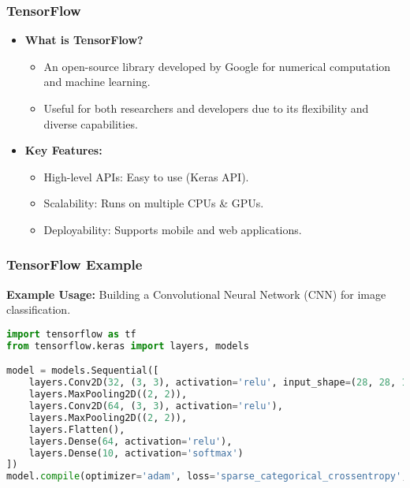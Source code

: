 \documentclass[aspectratio=169]{beamer}
\begin{document}
\begin{frame}
    \frametitle{TensorFlow}
    \begin{itemize}
        \item \textbf{What is TensorFlow?}
            \begin{itemize}
                \item An open-source library developed by Google for numerical computation and machine learning.
                \item Useful for both researchers and developers due to its flexibility and diverse capabilities.
            \end{itemize}
        \item \textbf{Key Features:}
            \begin{itemize}
                \item High-level APIs: Easy to use (Keras API).
                \item Scalability: Runs on multiple CPUs \& GPUs.
                \item Deployability: Supports mobile and web applications.
            \end{itemize}
    \end{itemize}
\end{frame}

\begin{frame}[fragile]
    \frametitle{TensorFlow Example}
    \textbf{Example Usage:} Building a Convolutional Neural Network (CNN) for image classification. 

    \begin{lstlisting}[language=Python]
import tensorflow as tf
from tensorflow.keras import layers, models

model = models.Sequential([
    layers.Conv2D(32, (3, 3), activation='relu', input_shape=(28, 28, 1)),
    layers.MaxPooling2D((2, 2)),
    layers.Conv2D(64, (3, 3), activation='relu'),
    layers.MaxPooling2D((2, 2)),
    layers.Flatten(),
    layers.Dense(64, activation='relu'),
    layers.Dense(10, activation='softmax')
])
model.compile(optimizer='adam', loss='sparse_categorical_crossentropy', metrics=['accuracy'])
    \end{lstlisting}
\end{frame}
\end{document}
